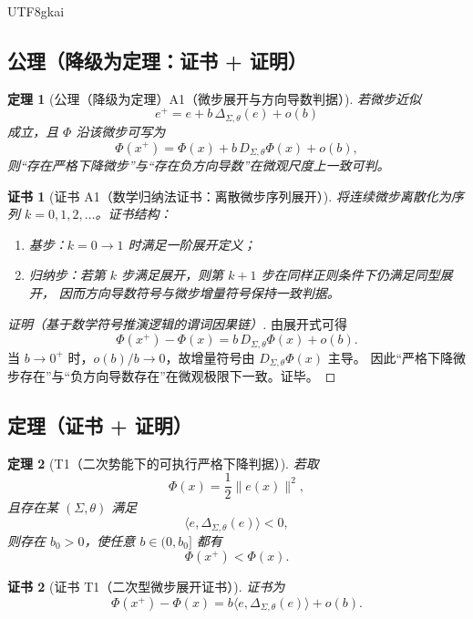 \documentclass[12pt]{article}
\newtheorem{theorem}{定理}[section]
\newtheorem{Certificate}{证书}[section]
\begin{document}
\begin{CJK*}{UTF8}{gkai}
\subsection{公理（降级为定理：证书 + 证明）}
\label{subsec:tex28-ch10-axioms}

\begin{theorem}[公理（降级为定理）A1（微步展开与方向导数判据）]
\label{thm:tex28-ch10-a1}
若微步近似
\[
  e^{+}=e+b\,\Delta_{\Sigma,\theta}(e)+o(b)
\]
成立，且 $\Phi$ 沿该微步可写为
\[
  \Phi(x^{+})=\Phi(x)+b\,D_{\Sigma,\theta}\Phi(x)+o(b),
\]
则“存在严格下降微步”与“存在负方向导数”在微观尺度上一致可判。
\end{theorem}

\begin{Certificate}[证书 A1（数学归纳法证书：离散微步序列展开）]
\label{cert:tex28-ch10-a1}
将连续微步离散化为序列 $k=0,1,2,\dots$。证书结构：
\begin{enumerate}
  \item 基步：$k=0\to1$ 时满足一阶展开定义；
  \item 归纳步：若第 $k$ 步满足展开，则第 $k+1$ 步在同样正则条件下仍满足同型展开，
  因而方向导数符号与微步增量符号保持一致判据。
\end{enumerate}
\end{Certificate}

\begin{proof}[证明（基于数学符号推演逻辑的谓词因果链）]
由展开式可得
\[
  \Phi(x^{+})-\Phi(x)=b\,D_{\Sigma,\theta}\Phi(x)+o(b).
\]
当 $b\to0^+$ 时，$o(b)/b\to0$，故增量符号由 $D_{\Sigma,\theta}\Phi(x)$ 主导。
因此“严格下降微步存在”与“负方向导数存在”在微观极限下一致。证毕。
\end{proof}

\subsection{定理（证书 + 证明）}
\label{subsec:tex28-ch10-theorems}

\begin{theorem}[T1（二次势能下的可执行严格下降判据）]
\label{thm:tex28-ch10-t1}
若取
\[
  \Phi(x)=\frac12\|e(x)\|^2,
\]
且存在某 $(\Sigma,\theta)$ 满足
\[
  \langle e,\Delta_{\Sigma,\theta}(e)\rangle<0,
\]
则存在 $b_0>0$，使任意 $b\in(0,b_0]$ 都有
\[
  \Phi(x^+)<\Phi(x).
\]
\end{theorem}

\begin{Certificate}[证书 T1（二次型微步展开证书）]
\label{cert:tex28-ch10-t1}
证书为
\[
  \Phi(x^+)-\Phi(x)=b\langle e,\Delta_{\Sigma,\theta}(e)\rangle+o(b).
\]
\end{Certificate}


\end{CJK*}
\end{document}
